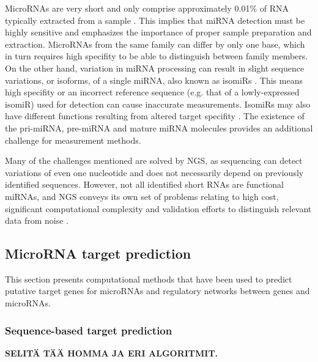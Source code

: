 MicroRNAs are very short and only comprise approximately 0.01\% of RNA
typically extracted from a sample \citep{Dong2013}. This implies that miRNA
detection must be highly sensitive and emphasizes the importance of proper
sample preparation and extraction. MicroRNAs from the same family can differ by only one
base, which in turn requires high specifity to be able to distinguish between
family members. On the other hand, variation in miRNA processing
can result in slight sequence variations, or isoforms, of a single miRNA,
also known as isomiRs \citep{StaregaRoslan2011,Lee2010}. This means high specifity
or an incorrect reference sequence (e.g. that of a lowly-expressed isomiR) 
used for detection can cause inaccurate measurements. IsomiRs may also
have different functions resulting from altered target specifity \citep{Chugh2012}.
The existence of the pri-miRNA, pre-miRNA and mature miRNA molecules provides an additional
challenge for measurement methods.

Many of the challenges mentioned are solved by NGS, as sequencing can detect
variations of even one nucleotide and does not necessarily depend on
previously identified sequences. However, not all
identified short RNAs are functional miRNAs, and NGS conveys its own set of
problems relating to high cost, significant computational complexity and
validation efforts to distinguish relevant data from noise
\citep{Chugh2012,Hunt2015}.







\subsection{MicroRNA target prediction}\label{mirna-target-prediction}

This section presents computational methods that have been used to predict
putative target genes for microRNAs and regulatory networks between genes and
microRNAs.





\subsubsection{Sequence-based target prediction}\label{sequence-based-target-
prediction}

\textbf{SELITÄ TÄÄ HOMMA JA ERI ALGORITMIT.}

